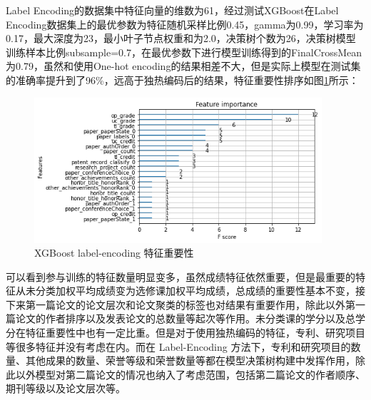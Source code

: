 Label Encoding的数据集中特征向量的维数为61，经过测试XGBoost在Label Encoding数据集上的最优参数为特征随机采样比例0.45，gamma为0.99，学习率为0.17，最大深度为23，最小叶子节点权重和为2.0，决策树个数为26，决策树模型训练样本比例subsample=0.7，在最优参数下进行模型训练得到的FinalCrossMean为0.79，虽然和使用One-hot encoding的结果相差不大，但是实际上模型在测试集的准确率提升到了96\%，远高于独热编码后的结果，特征重要性排序如图\ref{XGBoost-label-encoding-feature-importance}所示：
\begin{figure}[htb]
  \vspace{13pt} %
  \centering
  \includegraphics[width=0.95\textwidth]{images/XGBoost-label-encoding-feature-importance.png}
  \caption{XGBoost label-encoding 特征重要性}\label{XGBoost-label-encoding-feature-importance} %
\end{figure}

可以看到参与训练的特征数量明显变多，虽然成绩特征依然重要，但是最重要的特征从未分类加权平均成绩变为选修课加权平均成绩，总成绩的重要性基本不变，接下来第一篇论文的论文层次和论文聚类的标签也对结果有重要作用，除此以外第一篇论文的作者排序以及发表论文的总数量等起次等作用。未分类课的学分以及总学分在特征重要性中也有一定比重。但是对于使用独热编码的特征，专利、研究项目等很多特征并没有考虑在内。而在 Label-Encoding 方法下，专利和研究项目的数量、其他成果的数量、荣誉等级和荣誉数量等都在模型决策树构建中发挥作用，除此以外模型对第二篇论文的情况也纳入了考虑范围，包括第二篇论文的作者顺序、期刊等级以及论文层次等。

